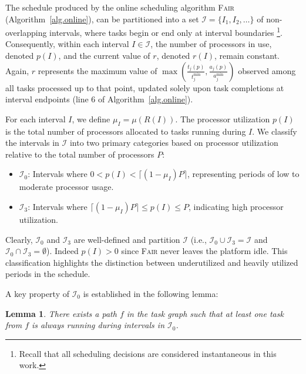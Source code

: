 \documentclass{article}
\newtheorem{lemma}{Lemma}
\newcommand\fair{\textsc{Fair}\xspace}
\newcommand\ratio{R\xspace}
\newcommand\rratio{r\xspace}
\begin{document}
 The schedule produced by the online scheduling algorithm \textsc{Fair} (Algorithm~\ref{alg.online}), can be partitioned into a set $\mathcal{I} = \{I_1, I_2, \dots\}$ of non-overlapping intervals, where tasks begin or end only at interval boundaries \footnote{Recall that all scheduling decisions are considered instantaneous in this work.}. Consequently, within each interval $I \in \mathcal{I}$, the number of processors in use, denoted $p(I)$, and the current value of $\rratio$, denoted $\rratio(I)$, remain constant. Again, $\rratio$ represents the maximum value of $\max\left( \frac{t_j(p)}{t_j^{\min}}, \frac{a_j(p)}{a_j^{\min}} \right)$ observed among all tasks processed up to that point, updated solely upon task completions at interval endpoints (line 6 of Algorithm~\ref{alg.online}).

For each interval $I$, we define $\mu_I = \mu(\ratio(I))$. The processor utilization $p(I)$ is the total number of processors allocated to tasks running during $I$. We classify the intervals in $\mathcal{I}$ into two primary categories based on processor utilization relative to the total number of processors $P$:

\begin{itemize}
    \item $\mathcal{I}_0$: Intervals where $0 < p(I) < \lceil (1 - \mu_I) P \rceil$, representing periods of low to moderate processor usage.
    \item $\mathcal{I}_3$: Intervals where $\lceil (1 - \mu_I) P \rceil \leq p(I) \leq P$, indicating high processor utilization.
\end{itemize}

Clearly, $\mathcal{I}_0$ and $\mathcal{I}_3$ are well-defined and partition $\mathcal{I}$ (i.e., $\mathcal{I}_0 \cup \mathcal{I}_3 = \mathcal{I}$ and $\mathcal{I}_0 \cap \mathcal{I}_3 = \emptyset$). Indeed $p(I)>0$ since \fair never leaves the platform idle. This classification highlights the distinction between underutilized and heavily utilized periods in the schedule.

A key property of $\mathcal{I}_0$ is established in the following lemma:

\begin{lemma}\label{lem.I0_path}
    There exists a path $f$ in the task graph such that at least one task from $f$ is always running during intervals in $\mathcal{I}_0$.
\end{lemma}
\end{document}

